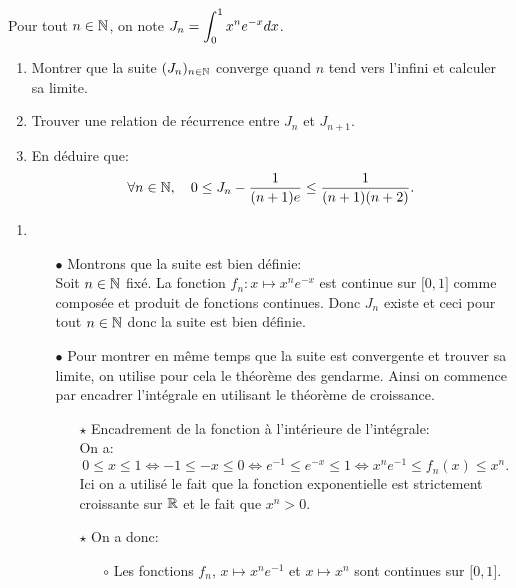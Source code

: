 \documentclass[a4paper, 11pt,reqno]{article}
\begin{document}
\begin{exercice}  \;
	Pour tout $n\in\mathbb{N}$, on note $J_n=\displaystyle \int_0^1 x^ne^{-x}dx$.
	\begin{enumerate}
		\item Montrer que la suite $(J_n)_{n\in\mathbb{N}}$ converge quand $n$ tend vers l'infini et calculer sa limite.
		\item Trouver une relation de r\'ecurrence entre $J_n$ et $J_{n+1}$.
		\item En d\'eduire que:
		      $$\forall n\in\mathbb{N},\quad 0\leq J_n-\displaystyle\frac{1}{(n+1)e}\leq \displaystyle\frac{1}{(n+1)(n+2)}.$$
	\end{enumerate}
\end{exercice}
\begin{correction}\;
	\begin{enumerate}
		\item
		      \begin{itemize}
			      \item[$\bullet$] Montrons que la suite est bien d\'efinie:\\
			            \noindent Soit $n\in\mathbb{N}$ fix\'e. La fonction $f_n: x\mapsto x^n e^{-x}$ est continue sur $\lbrack 0,1\rbrack$ comme compos\'ee et produit de fonctions continues. Donc $J_n$ existe et ceci pour tout $n\in\mathbb{N}$ donc la suite est bien d\'efinie.
			      \item[$\bullet$] Pour montrer en m\^{e}me temps que la suite est convergente et trouver sa limite, on utilise pour cela le th\'eor\`{e}me des gendarme. Ainsi on commence par encadrer l'int\'egrale en utilisant le th\'eor\`{e}me de croissance.
			            \begin{itemize}
				            \item[$\star$] Encadrement de la fonction \`{a} l'int\'erieure de l'int\'egrale:\\
				                  \noindent On a:
				                  $$0\leq x \leq 1\Leftrightarrow -1\leq -x\leq 0\Leftrightarrow e^{-1}\leq e^{-x}\leq 1\Leftrightarrow x^ne^{-1}\leq f_n(x) \leq x^n.$$
				                  Ici on a utilis\'e le fait que la fonction exponentielle est strictement croissante sur $\mathbb{R}$ et le fait que $x^n>0$.
				            \item[$\star$] On a donc:
				                  \begin{itemize}
					                  \item[$\circ$] Les fonctions $f_n$, $x\mapsto x^n e^{-1}$ et $x\mapsto x^n$ sont continues sur $\lbrack 0,1\rbrack$.

\end{itemize}
\end{itemize}
\end{itemize}
\end{enumerate}
\end{correction}
\end{document}
